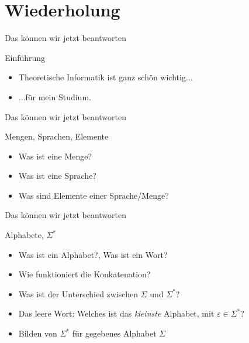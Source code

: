 \documentclass[10pt]{beamer}
\newcommand{\emptyWord}{\varepsilon}
\newcommand{\SigmaStern}{\Sigma^{*}}
\begin{document}
\section{Wiederholung} 
\begin{frame}[fragile]{Das können wir jetzt beantworten}
    \begin{alertblock}{Einführung}
    \begin{itemize}
        \item Theoretische Informatik ist ganz schön wichtig...
        \item ...für mein Studium.
    \end{itemize}
    \end{alertblock}
\end{frame}

\begin{frame}[fragile]{Das können wir jetzt beantworten}
    \begin{alertblock}{Mengen, Sprachen, Elemente}
    \begin{itemize}
        \item Was ist eine Menge?
        \item Was ist eine Sprache?
        \item Was sind Elemente einer Sprache/Menge?
    \end{itemize}
    \end{alertblock}
\end{frame}

\begin{frame}[fragile]{Das können wir jetzt beantworten}
    \begin{alertblock}{Alphabete, $\SigmaStern$}
    \begin{itemize}
        \item Was ist ein Alphabet?, Was ist ein Wort?
        \item Wie funktioniert die Konkatenation?
        \item Was ist der Unterschied zwischen $\Sigma$ und $\SigmaStern$?
        \item Das leere Wort: Welches ist das \textit{kleinste} Alphabet, mit $\emptyWord \in \SigmaStern$?
        \item Bilden von $\SigmaStern$ für gegebenes Alphabet $\Sigma$
    \end{itemize}
    \end{alertblock}
\end{frame}
\end{document}
